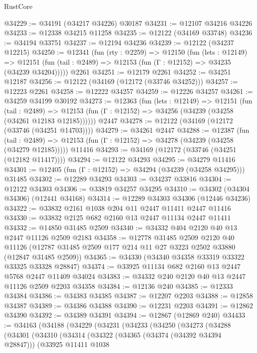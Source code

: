 \begin{lexlean}{RustCore}
\begin{coremodule}
@34229 := @34191 (@34217 @34226) @30187
@34231 := @12107 @34216 @34226
@34233 := @12338 @34215 @11258
@34235 := @12122 (@34169 @33748)
@34236 := @34194 @33751
@34237 := @12194 @34236
@34239 := @12122 (@34237 @12215)
@34250 := @12341
    (fun (rty : @2259) =>
    @12150
      (fun (lets : @12149) =>
      @12151 (fun (tail : @2489) => @12153 (fun (Γ : @12152) => @34235 (@34239 @34204)))))
    @2261
@34251 := @12179 @2261
@34252 := @34251 @12187
@34256 := @12122 (@34169 (@12172 (@33746 @34252)))
@34257 := @12223 @2261
@34258 := @12222 @34257
@34259 := @12226 @34257
@34261 := @34259 @34199 @30192
@34273 := @12363
    (fun (lets : @12149) =>
    @12151
      (fun (tail : @2489) =>
      @12153 (fun (Γ : @12152) => @34256 (@34239 (@34258 (@34261 @12183 @12185))))))
    @2447
@34278 := @12122 (@34169 (@12172 (@33746 (@34251 @14703))))
@34279 := @34261 @2447
@34288 := @12387
    (fun (tail : @2489) => @12153 (fun (Γ : @12152) => @34278 (@34239 (@34258 (@34279 @12185)))))
    @11416
@34293 := @34169 (@12172 (@33746 (@34251 (@12182 @11417))))
@34294 := @12122 @34293
@34295 := @34279 @11416
@34301 := @12405 (fun (Γ : @12152) => @34294 (@34239 (@34258 @34295))) @31485
@34302 := @12289 @34293
@34303 := @34237 @33816
@34304 := @12122 @34303
@34306 := @33819 @34257 @34295
@34310 := @34302 (@34304 @34306) (@12441 @34168)
@34314 := @12289 @34303 @34306 (@12446 @34236)
@34322 := @33832 @2161 @1038 @204 @11 @2447 @11411 @2447 @11416
@34330 := @33832 @2125 @682 @2160 @13 @2447 @11134 @2447 @11411
@34332 := @14850 @31485 @2509
@34340 := @34332 @404 @2120 @40 @13 @2447 @11126 @2509 @2183
@34358 := @12778
    @31485
    @2509
    @2120
    @40
    @11126
    (@12787 @31485 @2509 @177 @214 @11 @27 @3223 @2502 @33880 (@12847 @31485 @2509))
@34365 := @34330 (@34340 @34358 @33319 @33322 @33325 @33328 @28847)
@34374 := @33925 @11134 @682 @2160 @13 @2447 @5768 @2447 @11409 @34024
@34383 := @34332 @240 @2120 @40 @13 @2447 @11126 @2509 @2203 @34358
@34384 := @12136 @240
@34385 := @12333 @34384
@34386 := @34383 @34385
@34387 := @12207 @2203
@34388 := @12858 @34387
@34389 := @34386 @34388
@34390 := @12231 @2203
@34391 := @12862 @34390
@34392 := @34389 @34391
@34394 := @12867 (@12869 @240)
@34433 := @34163
    (@34188
      (@34229
        (@34231
          (@34233
            (@34250
              (@34273
                (@34288
                  (@34301
                    (@34310
                      (@34314
                        (@34322
                          (@34365 (@34374 (@34392 @34394 @28847)))
                          (@33925
                            @11411
                            @1038

\end{coremodule}
\end{lexlean}
